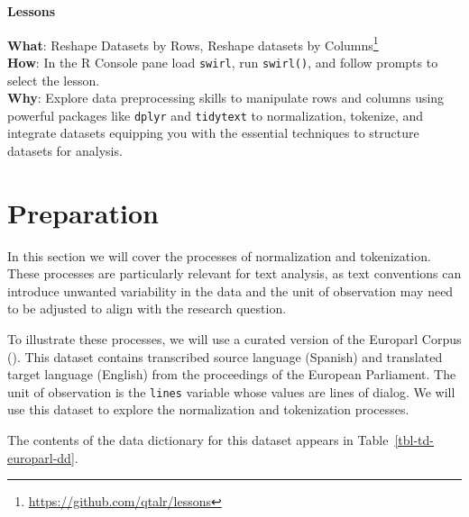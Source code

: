 \documentclass[
  letterpaper,
  DIV=11,
  numbers=noendperiod]{scrreprt}
\theoremstyle{definition}
\theoremstyle{remark}
\DeclareRobustCommand{\href}[2]{#2\footnote{\url{#1}}}
\begin{document}
\begin{tcolorbox}[enhanced jigsaw, leftrule=.75mm, colframe=quarto-callout-color-frame, colback=white, rightrule=.15mm, opacityback=0, arc=.35mm, breakable, bottomrule=.15mm, left=2mm, toprule=.15mm]

\textbf{ Lessons}

\textbf{What}: \href{https://github.com/qtalr/lessons}{Reshape Datasets
by Rows, Reshape datasets by Columns}\\
\textbf{How}: In the R Console pane load \texttt{swirl}, run
\texttt{swirl()}, and follow prompts to select the lesson.\\
\textbf{Why}: Explore data preprocessing skills to manipulate rows and
columns using powerful packages like \texttt{dplyr} and
\texttt{tidytext} to normalization, tokenize, and integrate datasets
equipping you with the essential techniques to structure datasets for
analysis.

\end{tcolorbox}

\section{Preparation}\label{sec-td-preparation}

In this section we will cover the processes of normalization and
tokenization. These processes are particularly relevant for text
analysis, as text conventions can introduce unwanted variability in the
data and the unit of observation may need to be adjusted to align with
the research question.

To illustrate these processes, we will use a curated version of the
Europarl Corpus (). This dataset
contains transcribed source language (Spanish) and translated target
language (English) from the proceedings of the European Parliament. The
unit of observation is the \texttt{lines} variable whose values are
lines of dialog. We will use this dataset to explore the normalization
and tokenization processes.

The contents of the data dictionary for this dataset appears in
Table~\ref{tbl-td-europarl-dd}.
\end{document}
